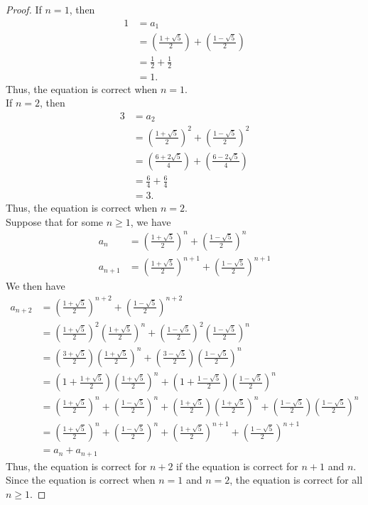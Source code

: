 \documentclass{article}
\begin{document}
\begin{enumerate}
\begin{proof}
    If $n = 1$, then 
    \begin{align}
        1 &= a_1 \\
          &= \left(\frac{1 + \sqrt{5}}{2}\right) + \left(\frac{1 - \sqrt{5}}{2}\right) \\
          &= \frac{1}{2} + \frac{1}{2} \\
          &= 1.
    \end{align}
    Thus, the equation is correct when $n = 1$. \\
    If $n = 2$, then 
    \begin{align}
        3 &= a_2 \\ 
          &= \left(\frac{1 + \sqrt{5}}{2}\right)^2 + \left(\frac{1 - \sqrt{5}}{2}\right)^2 \\
          &= \left(\frac{6 + 2\sqrt{5}}{4}\right) + \left(\frac{6 - 2\sqrt{5}}{4}\right) \\
          &= \frac{6}{4} + \frac{6}{4} \\
          &= 3.
    \end{align}
    Thus, the equation is correct when $n = 2$. \\
    Suppose that for some $n \geq 1$, we have
    \begin{align}
        a_n &= \left(\frac{1 + \sqrt{5}}{2}\right)^n + \left(\frac{1 - \sqrt{5}}{2}\right)^n \\
        a_{n+1} &= \left(\frac{1 + \sqrt{5}}{2}\right)^{n + 1} + \left(\frac{1 - \sqrt{5}}{2}\right)^{n + 1}
    \end{align}
    We then have
    \begin{align}
        a_{n+2} &= \left(\frac{1 + \sqrt{5}}{2}\right)^{n + 2} + \left(\frac{1 - \sqrt{5}}{2}\right)^{n + 2} \\
                &= \left(\frac{1 + \sqrt{5}}{2}\right)^2\left(\frac{1 + \sqrt{5}}{2}\right)^n + \left(\frac{1 - \sqrt{5}}{2}\right)^2\left(\frac{1 - \sqrt{5}}{2}\right)^n \\
                &= \left(\frac{3 + \sqrt{5}}{2}\right)\left(\frac{1 + \sqrt{5}}{2}\right)^n + \left(\frac{3 - \sqrt{5}}{2}\right)\left(\frac{1 - \sqrt{5}}{2}\right)^n \\
                &= \left(1 + \frac{1 + \sqrt{5}}{2}\right)\left(\frac{1 + \sqrt{5}}{2}\right)^n + \left(1 + \frac{1 - \sqrt{5}}{2}\right)\left(\frac{1 - \sqrt{5}}{2}\right)^n \\
                &= \left(\frac{1 + \sqrt{5}}{2}\right)^n + \left(\frac{1 - \sqrt{5}}{2}\right)^n + \left(\frac{1 + \sqrt{5}}{2}\right)\left(\frac{1 + \sqrt{5}}{2}\right)^n + \left(\frac{1 - \sqrt{5}}{2}\right)\left(\frac{1 - \sqrt{5}}{2}\right)^n \\
                &= \left(\frac{1 + \sqrt{5}}{2}\right)^n + \left(\frac{1 - \sqrt{5}}{2}\right)^n + \left(\frac{1 + \sqrt{5}}{2}\right)^{n + 1} + \left(\frac{1 - \sqrt{5}}{2}\right)^{n + 1} \\
                &= a_n + a_{n+1}
    \end{align}
    Thus, the equation is correct for $n+2$ if the equation is correct for $n+1$ and $n$. Since the equation is correct when $n = 1$ and $n = 2$, the equation is correct for all $n \geq 1$.
    

\end{proof}
\end{enumerate}
\end{document}
